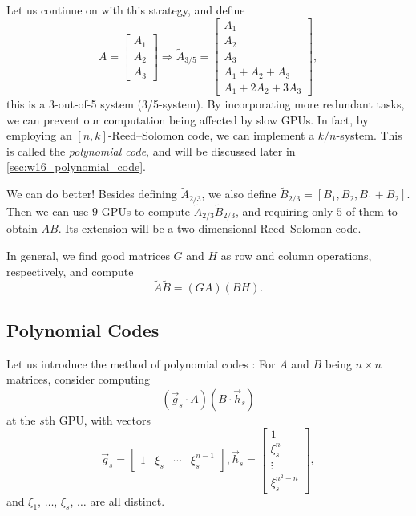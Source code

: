 Let us continue on with this strategy, and define
\begin{equation*}
    A = \left[\begin{matrix}
        A_1 \\ A_2 \\ A_3
    \end{matrix}\right] \Rightarrow \tilde{A}_{3/5} = \left[\begin{matrix}
        A_1 \\ A_2 \\ A_3 \\ A_1+A_2+A_3 \\ A_1+2A_2+3A_3
    \end{matrix}\right],
\end{equation*}
this is a 3-out-of-5 system (3/5-system). By incorporating more redundant tasks, we can prevent our computation being affected by slow GPUs. In fact, by employing an $[n,k]$-Reed--Solomon code, we can implement a $k/n$-system. This is called the \textit{polynomial code}, and will be discussed later in \autoref{sec:w16_polynomial_code}.

We can do better! Besides defining $\tilde{A}_{2/3}$, we also define $\tilde{B}_{2/3} = [B_1,B_2,B_1+B_2]$. Then we can use $9$ GPUs to compute $\tilde{A}_{2/3}\tilde{B}_{2/3}$, and requiring only $5$ of them to obtain $AB$. Its extension will be a two-dimensional Reed--Solomon code.

In general, we find good matrices $G$ and $H$ as row and column operations, respectively, and compute
\begin{equation}
    \tilde{A}\tilde{B} = (GA)(BH).
\end{equation}

\subsection{Polynomial Codes} \label{sec:w13_polynomial_codes}
Let us introduce the method of polynomial codes \cite{polynomialcodes}: For $A$ and $B$ being $n\times n$ matrices, consider computing
\begin{equation}
    (\vec{g}_s\cdot A)(B\cdot \vec{h}_s)
\end{equation}
at the $s$th GPU, with vectors
\begin{equation}
    \vec{g}_s = \left[\begin{matrix}
        1 & \xi_s & \cdots & \xi_s^{n-1}
    \end{matrix}\right], \vec{h}_s = \left[\begin{matrix}
        1 \\ \xi_s^n \\ \vdots \\ \xi_s^{n^2-n}
    \end{matrix}\right],
\end{equation}
and $\xi_1$, $\ldots$, $\xi_s$, $\ldots$ are all distinct.

